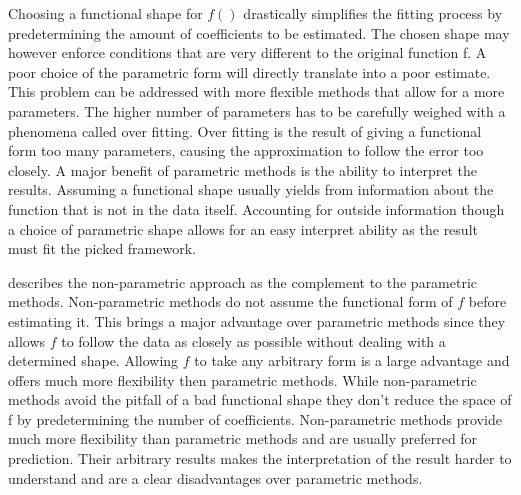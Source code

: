 \documentclass{article}
\begin{document}
    Choosing a functional shape for $f()$ drastically simplifies the fitting process by predetermining the amount of coefficients to be estimated. The chosen shape may however enforce conditions that are very different to the original function f. A poor choice of the parametric form will directly translate into a poor estimate. This problem can be addressed with more flexible methods that allow for a more parameters. The higher number of parameters has to be carefully weighed with a phenomena called over fitting. Over fitting is the result of giving a functional form too many parameters, causing the approximation to follow the error too closely. A major benefit of parametric methods is the ability to interpret the results. Assuming a functional shape usually yields from information about the function that is not in the data itself. Accounting for outside information though a choice of parametric shape allows for an easy interpret ability as the result must fit the picked framework.
    
    \cite{hastie} describes the non-parametric approach as the complement to the parametric methods. Non-parametric methods do not assume the functional form of $f$ before estimating it. This brings a major advantage over parametric methods since they allows $f$ to follow the data as closely as possible without dealing with a determined shape. Allowing $f$ to take any arbitrary form is a large advantage and offers much more flexibility then parametric methods. While non-parametric methods avoid the pitfall of  a bad functional shape they don't reduce the space of f by predetermining the number of coefficients. Non-parametric methods provide much more flexibility than parametric methods and are usually preferred for prediction. Their arbitrary results makes the interpretation of the result harder to understand and are a clear disadvantages over parametric methods.
    
\end{document}
